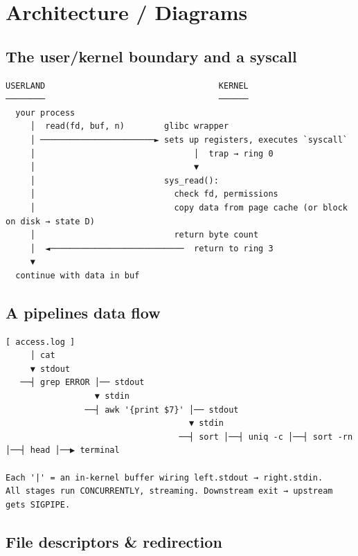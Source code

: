 \documentclass[11pt]{article}
\begin{document}
\section{Architecture / Diagrams}\label{architecture--diagrams}

\subsection{The user/kernel boundary and a syscall}\label{the-userkernel-boundary-and-a-syscall}

\setcodelang{}

\begin{verbatim}
USERLAND                                   KERNEL
────────                                   ──────
  your process
     │  read(fd, buf, n)        glibc wrapper
     │ ───────────────────────► sets up registers, executes `syscall`
     │                                │  trap → ring 0
     │                                ▼
     │                          sys_read():
     │                            check fd, permissions
     │                            copy data from page cache (or block on disk → state D)
     │                            return byte count
     │  ◄───────────────────────────  return to ring 3
     ▼
  continue with data in buf
\end{verbatim}

\subsection{A pipeline\textquotesingle s data flow}\label{a-pipelines-data-flow}

\setcodelang{}

\begin{verbatim}
[ access.log ]
     │ cat
     ▼ stdout
   ──┤ grep ERROR │── stdout
                  ▼ stdin
                ──┤ awk '{print $7}' │── stdout
                                     ▼ stdin
                                   ──┤ sort │──┤ uniq -c │──┤ sort -rn │──┤ head │──▶ terminal

Each '|' = an in-kernel buffer wiring left.stdout → right.stdin.
All stages run CONCURRENTLY, streaming. Downstream exit → upstream gets SIGPIPE.
\end{verbatim}

\subsection{File descriptors \& redirection}\label{file-descriptors--redirection}
\end{document}
